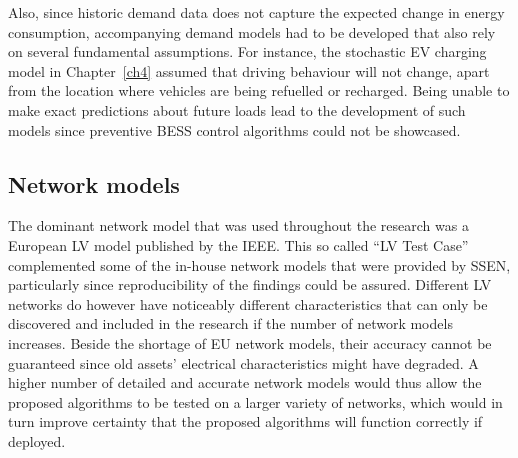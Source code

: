 Also, since historic demand data does not capture the expected change in energy consumption, accompanying demand models had to be developed that also rely on several fundamental assumptions.
For instance, the stochastic EV charging model in Chapter~\ref{ch4} assumed that driving behaviour will not change, apart from the location where vehicles are being refuelled or recharged.
Being unable to make exact predictions about future loads lead to the development of such models since preventive BESS control algorithms could not be showcased.

\subsection{Network models}

The dominant network model that was used throughout the research was a European LV model published by the IEEE.
This so called ``LV Test Case'' complemented some of the in-house network models that were provided by SSEN, particularly since reproducibility of the findings could be assured.
Different LV networks do however have noticeably different characteristics that can only be discovered and included in the research if the number of network models increases.
Beside the shortage of EU network models, their accuracy cannot be guaranteed since old assets' electrical characteristics might have degraded.
A higher number of detailed and accurate network models would thus allow the proposed algorithms to be tested on a larger variety of networks, which would in turn improve certainty that the proposed algorithms will function correctly if deployed.
